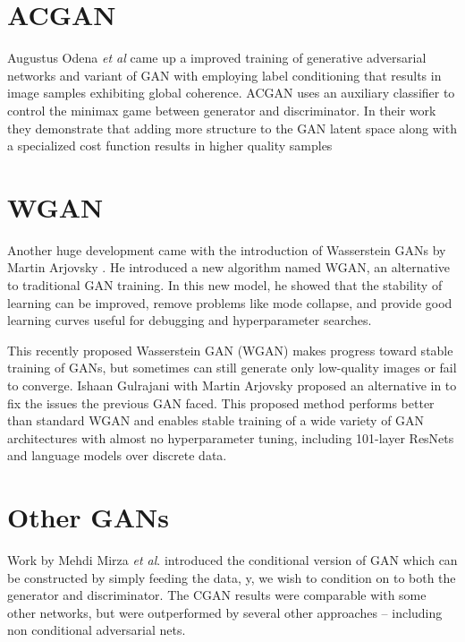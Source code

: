 
\section{ACGAN} %
\label{sec:acgan}
Augustus Odena \textit{et al} \cite{acgan} came up a improved training of generative adversarial networks and variant of GAN with employing label conditioning that results in image samples exhibiting global coherence. ACGAN uses an auxiliary classifier to control the minimax game between generator and discriminator. In their work they demonstrate that adding more structure to the GAN latent space along with a specialized cost function results in higher quality samples

\section{WGAN} %
\label{sec:wgan}
Another huge development came with the introduction of Wasserstein GANs by Martin Arjovsky \cite{wgan} . He introduced a new algorithm named WGAN, an alternative to traditional GAN training. In this new model, he showed that the stability of learning can be improved, remove problems like mode collapse, and provide good learning curves useful for debugging and hyperparameter searches.
\par\bigskip

This recently proposed Wasserstein GAN (WGAN) \cite{wgan} makes progress toward stable training of GANs, but sometimes can still generate only low-quality images or fail to converge. 
Ishaan Gulrajani with Martin Arjovsky proposed an alternative in \cite{improvedwgan} to fix the issues the previous GAN faced. This proposed method performs better than standard WGAN and enables stable training of a wide variety of GAN architectures with almost no hyperparameter tuning, including 101-layer ResNets \cite{deepresidual} and language models over discrete data.
\par\bigskip

\section{Other GANs} %
\label{sec:other_gan}
Work by Mehdi Mirza \textit{et al}. \cite{congan} introduced the conditional version of GAN which can be constructed by simply feeding the data, y, we wish to condition on to both the generator and discriminator. The CGAN results were comparable with some other networks, but were outperformed by several other approaches – including non conditional adversarial nets.
\par\bigskip

